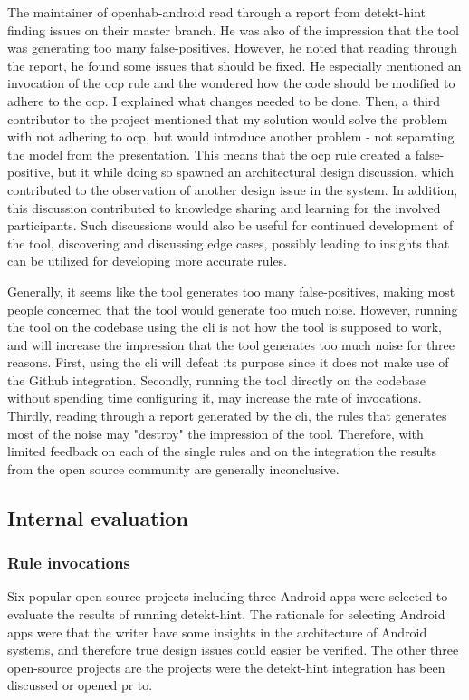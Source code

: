 \documentclass{report}
\begin{document}
The maintainer of openhab-android\cite{openhab} read through a report from detekt-hint finding issues on their master branch. He was also of the impression that the tool was generating too many false-positives. However, he noted that reading through the report, he found some issues that should be fixed. He especially mentioned an invocation of the \gls{ocp} rule and the wondered how the code should be modified to adhere to the \gls{ocp}. I explained what changes needed to be done. Then, a third contributor to the project mentioned that my solution would solve the problem with not adhering to \gls{ocp}, but would introduce another problem - not separating the model from the presentation. This means that the \gls{ocp} rule created a false-positive, but it while doing so spawned an architectural design discussion, which contributed to the observation of another design issue in the system. In addition, this discussion contributed to knowledge sharing and learning for the involved participants. Such discussions would also be useful for continued development of the tool, discovering and discussing edge cases, possibly leading to insights that can be utilized for developing more accurate rules. 

Generally, it seems like the tool generates too many false-positives, making most people concerned that the tool would generate too much noise. However, running the tool on the codebase using the \gls{cli} is not how the tool is supposed to work, and will increase the impression that the tool generates too much noise for three reasons. First, using the \gls{cli} will defeat its purpose since it does not make use of the Github integration. Secondly, running the tool directly on the codebase without spending time configuring it, may increase the rate of invocations. Thirdly, reading through a report generated by the \gls{cli}, the rules that generates most of the noise may "destroy" the impression of the tool. Therefore, with limited feedback on each of the single rules and on the integration the results from the open source community are generally inconclusive.
 
\subsection{Internal evaluation}
\label{evaluation-internal}
\subsubsection{Rule invocations}
Six popular open-source projects including three Android apps were selected to evaluate the results of running detekt-hint. The rationale for selecting Android apps were that the writer have some insights in the architecture of Android systems, and therefore true design issues could easier be verified. The other three open-source projects are the projects were the detekt-hint integration has been discussed or opened \gls{pr} to. 
\end{document}
